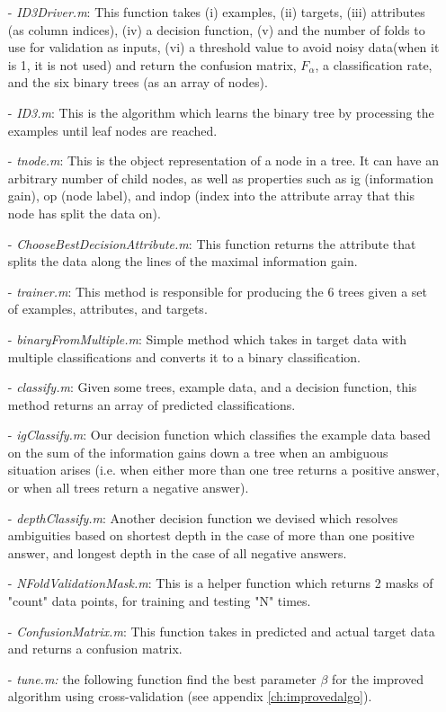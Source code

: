 \documentclass[a4paper,12pt,oneside,final]{report}
\begin{document}
\begin{itemize}
\item[-] \emph{ID3Driver.m}: This function takes (i) examples, (ii) targets, (iii) attributes (as column indices), (iv) a decision function, (v) and the number of folds to use for validation as inputs, (vi) a threshold value to avoid noisy data(when it is 1, it is not used) and return the confusion matrix, $F_{\alpha}$, a classification rate, and the six binary trees (as an array of nodes).
\item[-] \emph{ID3.m}: This is the algorithm which learns the binary tree by processing the examples until leaf nodes are reached.
\item[-] \emph{tnode.m}: This is the object representation of a node in a tree.  It can have an arbitrary number of child nodes, as well as properties such as ig (information gain), op (node label), and indop (index into the attribute array that this node has split the data on).
\item[-] \emph{ChooseBestDecisionAttribute.m}: This function returns the attribute that splits the data along the lines of the maximal information gain.
\item[-] \emph{trainer.m}: This method is responsible for producing the 6 trees given a set of examples, attributes, and targets.
\item[-] \emph{binaryFromMultiple.m}: Simple method which takes in target data with multiple classifications and converts it to a binary classification.
\item[-] \emph{classify.m}: Given some trees, example data, and a decision function, this method returns an array of predicted classifications.
\item[-] \emph{igClassify.m}: Our decision function which classifies the example data based on the sum of the information gains down a tree when an ambiguous situation arises (i.e. when either more than one tree returns a positive answer, or when all trees return a negative answer).
\item[-] \emph{depthClassify.m}: Another decision function we devised which resolves ambiguities based on shortest depth in the case of more than one positive answer, and longest depth in the case of all negative answers.
\item[-] \emph{NFoldValidationMask.m}: This is a helper function which returns 2 masks of "count" data points, for training and testing "N" times.
\item[-] \emph{ConfusionMatrix.m}: This function takes in predicted and actual target data and returns a confusion matrix.
\item[-] \emph{tune.m:} the following function find the best parameter $\beta$ for the improved algorithm using cross-validation (see appendix \ref{ch:improvedalgo}).
\end{itemize}
\end{document}
